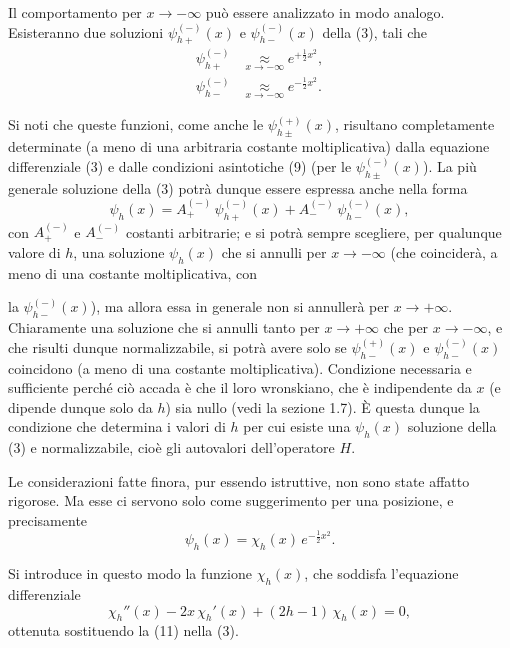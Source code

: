 \documentclass[11pt, a4paper]{book}
\numberwithin{equation}{section}
\begin{document}
Il comportamento per $x \to -\infty$ può essere analizzato in modo analogo.
Esisteranno due soluzioni $\psi_{h+}^{(-)}(x)$ e $\psi_{h-}^{(-)}(x)$
della (3), tali che
\begin{align}
\psi_{h+}^{(-)} &\underset{x\to-\infty}{\approx} e^{+\frac{1}{2}x^2}, \tag{9a} \\
\psi_{h-}^{(-)} &\underset{x\to-\infty}{\approx} e^{-\frac{1}{2}x^2}. \tag{9b}
\end{align}

Si noti che queste funzioni, come anche le $\psi_{h\pm}^{(+)}(x)$,
risultano completamente determinate (a meno di una arbitraria costante
moltiplicativa) dalla equazione differenziale (3) e dalle condizioni
asintotiche (9) (per le $\psi_{h\pm}^{(-)}(x)$). La più generale
soluzione della (3) potrà dunque essere espressa anche nella forma
\begin{equation}
\psi_h(x) = A_+^{(-)}\,\psi_{h+}^{(-)}(x) + A_-^{(-)}\,\psi_{h-}^{(-)}(x),
\end{equation}
con $A_+^{(-)}$ e $A_-^{(-)}$ costanti arbitrarie; e si potrà sempre
scegliere, per qualunque valore di $h$, una soluzione $\psi_h(x)$ che si
annulli per $x \to -\infty$ (che coinciderà, a meno di una costante
moltiplicativa, con


la $\psi_{h-}^{(-)}(x)$), ma allora essa in generale non si annullerà
per $x \to +\infty$. Chiaramente una soluzione che si annulli tanto per
$x \to +\infty$ che per $x \to -\infty$, e che risulti dunque
normalizzabile, si potrà avere solo se $\psi_{h-}^{(+)}(x)$ e
$\psi_{h-}^{(-)}(x)$ coincidono (a meno di una costante moltiplicativa).
Condizione necessaria e sufficiente perché ciò accada è che il loro
wronskiano, che è indipendente da $x$ (e dipende dunque solo da $h$) sia
nullo (vedi la sezione 1.7). È questa dunque la condizione che determina
i valori di $h$ per cui esiste una $\psi_h(x)$ soluzione della (3) e
normalizzabile, cioè gli autovalori dell'operatore $H$.

Le considerazioni fatte finora, pur essendo istruttive, non sono state
affatto rigorose. Ma esse ci servono solo come suggerimento per una
posizione, e precisamente
\begin{equation}
\psi_h(x) = \chi_h(x)\,e^{-\frac{1}{2}x^2}.
\end{equation}

Si introduce in questo modo la funzione $\chi_h(x)$, che soddisfa
l'equazione differenziale
\begin{equation}
\chi_h''(x) - 2x\,\chi_h'(x) + (2h-1)\,\chi_h(x) = 0,
\end{equation}
ottenuta sostituendo la (11) nella (3).
\end{document}
